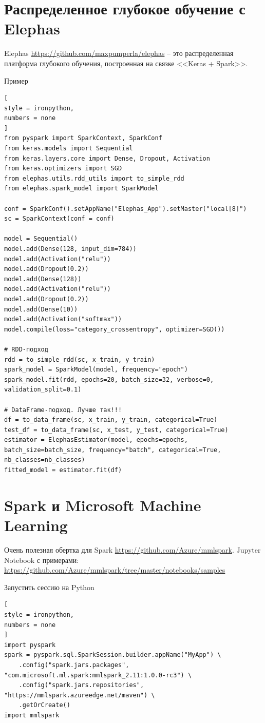 \documentclass[%
	11pt,
	a4paper,
	utf8,
		]{article}
\begin{document}
\section{Распределенное глубокое обучение с Elephas}

Elephas \url{https://github.com/maxpumperla/elephas} -- это распределенная платформа глубокого обучения, построенная на связке <<Keras + Spark>>.

Пример
\begin{lstlisting}[
style = ironpython,
numbers = none	
]
from pyspark import SparkContext, SparkConf
from keras.models import Sequential
from keras.layers.core import Dense, Dropout, Activation
from keras.optimizers import SGD
from elephas.utils.rdd_utils import to_simple_rdd
from elephas.spark_model import SparkModel

conf = SparkConf().setAppName("Elephas_App").setMaster("local[8]")
sc = SparkContext(conf = conf)

model = Sequential()
model.add(Dense(128, input_dim=784))
model.add(Activation("relu"))
model.add(Dropout(0.2))
model.add(Dense(128))
model.add(Activation("relu"))
model.add(Dropout(0.2))
model.add(Dense(10))
model.add(Activation("softmax"))
model.compile(loss="category_crossentropy", optimizer=SGD())

# RDD-подход
rdd = to_simple_rdd(sc, x_train, y_train)
spark_model = SparkModel(model, frequency="epoch")
spark_model.fit(rdd, epochs=20, batch_size=32, verbose=0, validation_split=0.1)

# DataFrame-подход. Лучше так!!!
df = to_data_frame(sc, x_train, y_train, categorical=True)
test_df = to_data_frame(sc, x_test, y_test, categorical=True)
estimator = ElephasEstimator(model, epochs=epochs, batch_size=batch_size, frequency="batch", categorical=True, nb_classes=nb_classes)
fitted_model = estimator.fit(df)
\end{lstlisting}

\section{Spark и Microsoft Machine Learning}

Очень полезная обертка для Spark \url{https://github.com/Azure/mmlspark}. 
Jupyter Notebook с примерами: \url{https://github.com/Azure/mmlspark/tree/master/notebooks/samples}

Запустить сессию на Python
\begin{lstlisting}[
style = ironpython,
numbers = none	
]
import pyspark
spark = pyspark.sql.SparkSession.builder.appName("MyApp") \
    .config("spark.jars.packages", "com.microsoft.ml.spark:mmlspark_2.11:1.0.0-rc3") \
    .config("spark.jars.repositories", "https://mmlspark.azureedge.net/maven") \
    .getOrCreate()
import mmlspark
\end{lstlisting}
\end{document}
